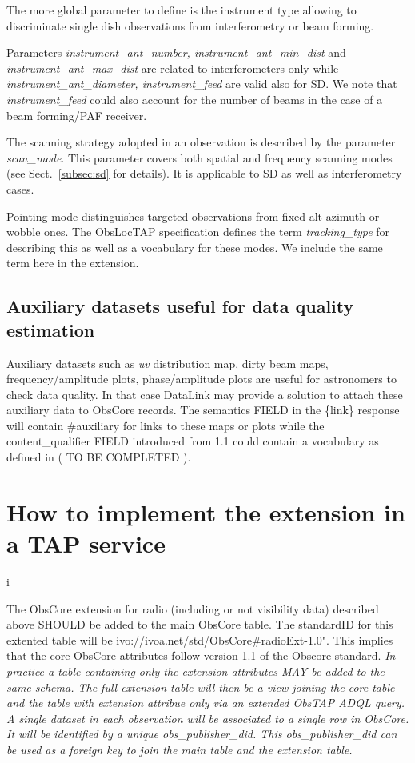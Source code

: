 \documentclass[11pt,a4paper]{ivoa}
\begin{document}
The more global parameter to define is the instrument type allowing to discriminate single dish observations from interferometry or beam forming. 

Parameters \emph{instrument\_ant\_number, instrument\_ant\_min\_dist} and  \emph{instrument\_ant\_max\_dist} are related to interferometers only while 
\emph{instrument\_ant\_diameter, instrument\_feed } are valid also for SD.
We note that \emph{instrument\_feed} could also  account for the number of beams in the case of a beam forming/PAF receiver.

The scanning strategy adopted in an observation is described by the parameter \emph{scan\_mode}. This parameter covers both spatial and frequency scanning modes (see Sect.~\ref{subsec:sd} for details). 
It is applicable to  SD as well as  interferometry cases.

Pointing mode distinguishes targeted observations from  fixed alt-azimuth or wobble ones. The ObsLocTAP specification \citep{2021ivoa.spec.0724S} defines the term \emph{tracking\_type} for describing this as well as a  vocabulary for these modes. 
We include the same term here in the extension.


\subsection{Auxiliary datasets useful for data quality estimation}

Auxiliary datasets such as  \emph{uv} distribution map, dirty beam maps, frequency/amplitude plots, phase/amplitude plots are useful for astronomers to check data quality.  
In that case DataLink \citep{2015ivoa.spec.0617D} may provide a solution to attach these auxiliary data to ObsCore records. The semantics FIELD in the \{link\} response  will contain \#auxiliary  for links to these maps or plots while  the content\_qualifier FIELD introduced from 1.1  could contain a vocabulary as defined in ( TO BE COMPLETED ). 

\section{How to implement the extension in a TAP service}i
\label{sec:implementation}

The ObsCore extension for radio (including or not visibility data) described above SHOULD  be added to the main ObsCore table. The standardID for this extented table will be ivo://ivoa.net/std/ObsCore\#radioExt-1.0". This implies that the  core ObsCore attributes follow version 1.1 of the Obscore standard.
\textit{ In practice a  table containing only the extension attributes  MAY be added to the same schema. The full extension table will then be a view joining the core table and the  table with extension attribue only via an extended ObsTAP ADQL query. A single dataset in each observation will be associated to a single row in ObsCore. It will be identified by a unique obs\_publisher\_did. This obs\_publisher\_did can be used as a foreign key to join the main table and the extension table.}
\end{document}
